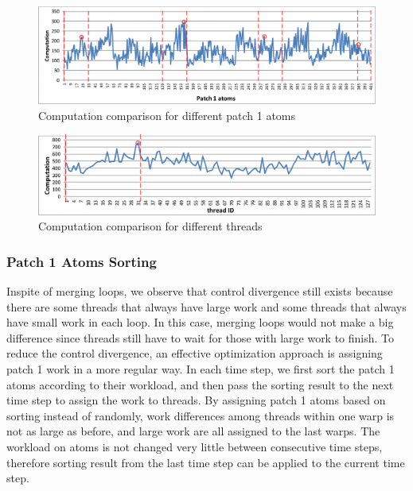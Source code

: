 \begin{figure}[h]
\centering
\setlength{\abovecaptionskip}{-1pt}
\setlength{\belowcaptionskip}{-2pt}
\includegraphics[width=6.0in]{figs/patch1_count-eps-converted-to}
\caption{Computation comparison for different patch 1 atoms}
\label{figs:patch1-count}
\vspace{-0.5cm}
\end{figure}

\begin{figure}[h]
\centering
\setlength{\abovecaptionskip}{-1pt}
\setlength{\belowcaptionskip}{-2pt}
\includegraphics[width=6.0in]{figs/thread_count-eps-converted-to}
\caption{Computation comparison for different threads}
\label{figs:thread-count}
\vspace{-0.3cm}
\end{figure}

\subsubsection{Patch 1 Atoms Sorting}

Inspite of merging loops, we observe that control divergence still exists because there are some threads that always have large work and some threads
that always have small work in each loop. In this case, merging loops would not make a big difference since threads still have to wait for those with
large work to finish. To reduce the control divergence, an effective optimization approach is assigning patch 1 work in a more regular way.
In each time step, we first sort the patch 1 atoms according to their workload, and then pass the sorting result to the next time step to assign the work to threads.
By assigning patch 1 atoms based on sorting instead of randomly, work differences among threads within one warp is not as large as before, and large work
are all assigned to the last warps. The workload on atoms is not changed very little between consecutive time steps, therefore sorting result from the last time step
can be applied to the current time step. 


